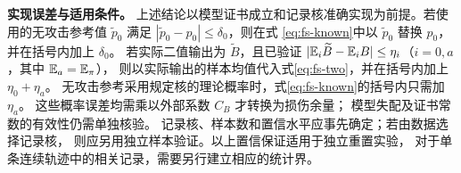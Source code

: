 \textbf{实现误差与适用条件。}
上述结论以模型证书成立和记录核准确实现为前提。若使用的无攻击参考值
$\tilde p_0$ 满足 $|\tilde p_0-p_0|\le\delta_0$，则在式
\eqref{eq:fs-known}中以 $\tilde p_0$ 替换 $p_0$，并在括号内加上 $\delta_0$。
若实际二值输出为 $\widetilde B$，且已验证
$|\mathbb E_i\widetilde B-\mathbb E_iB|\le\eta_i$（$i=0,a$，其中 $\mathbb E_a=\mathbb E_\pi$），
则以实际输出的样本均值代入式\eqref{eq:fs-two}，并在括号内加上 $\eta_0+\eta_a$。
无攻击参考采用规定核的理论概率时，式\eqref{eq:fs-known}的括号内只需加 $\eta_a$。
这些概率误差均需乘以外部系数 $C_B$ 才转换为损伤余量；
模型失配及证书常数的有效性仍需单独核验。
记录核、样本数和置信水平应事先确定；若由数据选择记录核，
则应另用独立样本验证。以上置信保证适用于独立重置实验，
对于单条连续轨迹中的相关记录，需要另行建立相应的统计界。
